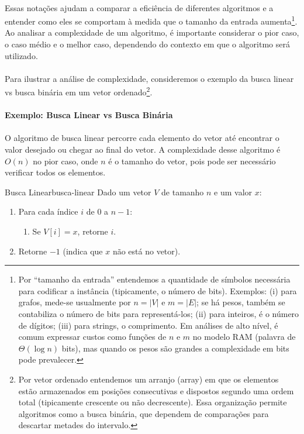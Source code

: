 \documentclass[12pt,a4paper]{article}
\begin{document}
\paragraph{}
Essas notações ajudam a comparar a eficiência de diferentes algoritmos e a entender como eles se comportam à medida que o tamanho da entrada aumenta\footnote{Por “tamanho da entrada” entendemos a quantidade de símbolos necessária para codificar a instância (tipicamente, o número de bits). Exemplos: (i) para grafos, mede-se usualmente por \(n=|V|\) e \(m=|E|\); se há pesos, também se contabiliza o número de bits para representá-los; (ii) para inteiros, é o número de dígitos; (iii) para strings, o comprimento. Em análises de alto nível, é comum expressar custos como funções de \(n\) e \(m\) no modelo RAM (palavra de \(\Theta(\log n)\) bits), mas quando os pesos são grandes a complexidade em bits pode prevalecer.}. Ao analisar a complexidade de um algoritmo, é importante considerar o pior caso, o caso médio e o melhor caso, dependendo do contexto em que o algoritmo será utilizado.

\paragraph{}
Para ilustrar a análise de complexidade, consideremos o exemplo da busca linear vs busca binária em um vetor ordenado\footnote{Por vetor ordenado entendemos um arranjo (array) em que os elementos estão armazenados em posições consecutivas e dispostos segundo uma ordem total (tipicamente crescente ou não decrescente). Essa organização permite algoritmos como a busca binária, que dependem de comparações para descartar metades do intervalo.}. 

\paragraph{Exemplo: Busca Linear vs Busca Binária}
\paragraph{}
O algoritmo de busca linear percorre cada elemento do vetor até encontrar o valor desejado ou chegar ao final do vetor. A complexidade desse algoritmo é \(O(n)\) no pior caso, onde \(n\) é o tamanho do vetor, pois pode ser necessário verificar todos os elementos.

\begin{algobox}{Busca Linear}{busca-linear}
Dado um vetor \(V\) de tamanho \(n\) e um valor \(x\):
\begin{enumerate}\setlength{\itemsep}{2pt}
    \item Para cada índice \(i\) de \(0\) a \(n - 1\):
    \begin{enumerate}\setlength{\itemsep}{2pt}
        \item Se \(V[i] = x\), retorne \(i\).
    \end{enumerate}
    \item Retorne \(-1\) (indica que \(x\) não está no vetor).
\end{enumerate}
\end{algobox}
\end{document}

